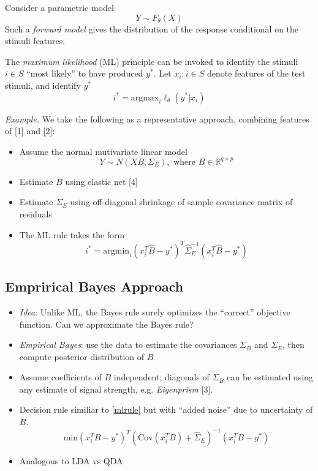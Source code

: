 \documentclass[12pt]{article}
\begin{document}
Consider a parametric model
\[
Y \sim F_\theta(X)
\]
Such a \emph{forward model} gives the distribution of the
response conditional on the stimuli features.

The \emph{maximum likelihood} (ML) principle can be invoked to
identify the stimuli $i \in S$ ``most likely'' to have produced $y^*$.
Let $x_i : i \in S$ denote features of the test stimuli, and
identify $y^*$
\[
i^* = \text{argmax}_i \ell_\theta(y^*| x_i)
\]

\emph{Example.} We take the following as a representative approach, combining features of [1] and [2]:
\begin{itemize}
\item Assume the normal mutivariate linear model
\[Y \sim N( XB , \Sigma_E), \text{ where }B \in \mathbb{R}^{q \times p}\]
\item Estimate $B$ using elastic net [4]
\item Estimate $\Sigma_E$ using off-diagonal shrinkage of sample covariance matrix of residuals
\item The ML rule takes the form
\begin{equation}\label{mlrule}
i^* = \text{argmin}_{i} (x_i^T \hat{B} - y^*)^T \hat{\Sigma}_E^{-1} (x_i^T \hat{B} - y^*)
\end{equation}
\end{itemize}

\subsection{Emprirical Bayes Approach}

\begin{itemize}
\item \emph{Idea}: Unlike ML, the Bayes rule surely optimizes the ``correct'' objective function.  Can we approximate the Bayes rule?
\item \emph{Empirical Bayes}: use the data to estimate the covariances
$\Sigma_B$ and $\Sigma_E$, then compute posterior distribution of $B$
\item Assume coefficients of $B$ independent; diagonals of $\Sigma_B$ can be estimated using any estimate of signal strength, e.g. \emph{Eigenprism} [3].
\item Decision rule similiar to \eqref{mlrule} but with ``added noise'' due to uncertainty of $B$.
\[
\text{min} (x_i^T B - y^*)^T (\text{Cov}(x_i^T B) + \hat{\Sigma}_E)^{-1} (x_i^T B - y^*)
\]
\item Analogous to LDA vs QDA
\end{itemize}
\end{document}
